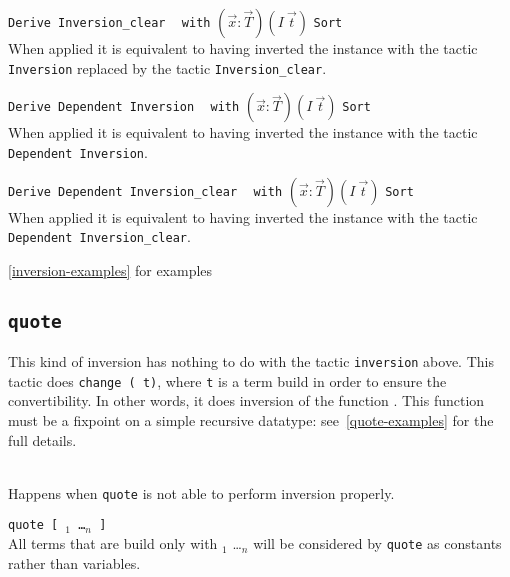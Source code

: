 \begin{Variants}
\item \texttt{Derive Inversion\_clear} \ident~ \texttt{with}
  $(\vec{x}:\vec{T})(I~\vec{t})$ \texttt{Sort} \sort~ \\ 
  When applied it is equivalent to having
  inverted the instance with the tactic \texttt{Inversion}
  replaced by the tactic \texttt{Inversion\_clear}.
\item \texttt{Derive Dependent Inversion} \ident~ \texttt{with}
  $(\vec{x}:\vec{T})(I~\vec{t})$ \texttt{Sort} \sort~\\
  When applied it is equivalent to having
  inverted the instance with the tactic \texttt{Dependent Inversion}.
\item \texttt{Derive Dependent Inversion\_clear} \ident~ \texttt{with}
  $(\vec{x}:\vec{T})(I~\vec{t})$ \texttt{Sort} \sort~\\
  When applied it is equivalent to having
  inverted the instance with the tactic \texttt{Dependent Inversion\_clear}.
\end{Variants}

\SeeAlso \ref{inversion-examples} for examples

\subsection{\tt quote \ident}

This kind of inversion has nothing to do with the tactic
\texttt{inversion} above. This tactic does \texttt{change (\ident\
  t)}, where \texttt{t} is a term build in order to ensure the
convertibility. In other words, it does inversion of the function
\ident. This function must be a fixpoint on a simple recursive
datatype: see~\ref{quote-examples} for the full details.

\begin{ErrMsgs}
\item {}\\
  Happens when \texttt{quote} is not able to perform inversion properly.
\end{ErrMsgs}

\begin{Variants}
\item \texttt{quote {\ident} [ \ident$_1$ \dots \ident$_n$ ]}\\
  All terms that are build only with \ident$_1$ \dots \ident$_n$ will be
  considered by \texttt{quote} as constants rather than variables.
\end{Variants}

